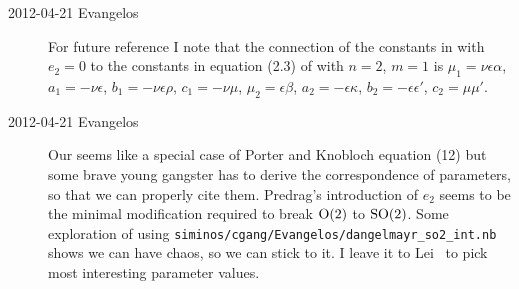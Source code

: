 \begin{description}
\item[2012-04-21 Evangelos] For future reference I note that the connection
of the constants in  with $e_2=0$ to the constants in
equation (2.3) of  with $n=2$, $m=1$ is $\mu_1=\nu\epsilon\alpha$,
$a_1=-\nu\epsilon$, $b_1=-\nu\epsilon\rho$, $c_1=-\nu\mu$, $\mu_2=\epsilon\beta$,
$a_2=-\epsilon\kappa$, $b_2=-\epsilon\epsilon'$, $c_2=\mu\mu'$.

\item[2012-04-21 Evangelos] Our  seems like a special case of
Porter and Knobloch equation (12) but some brave young gangster
has to derive the correspondence of parameters, so that we can properly cite
them. Predrag's introduction of $e_2$
seems to be the minimal modification required to break $\textrm{O}(2)$ to $\textrm{SO}(2)$.
Some exploration of 
using \texttt{siminos/cgang/Evangelos/dangelmayr\_so2\_int.nb}
shows we can have chaos, so we can stick to it. I leave it to Lei \etal\
to pick most interesting parameter values.

\end{description}
